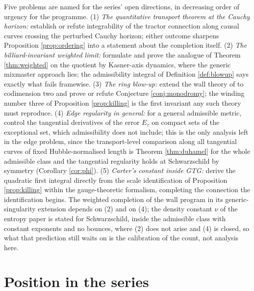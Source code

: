 \documentclass[11pt]{article}
\theoremstyle{definition}
\begin{document}
Five problems are named for the series' open directions, in decreasing order of urgency for the programme. (1) \emph{The quantitative transport theorem at the Cauchy horizon:} establish or refute integrability of the tractor connection along causal curves crossing the perturbed Cauchy horizon; either outcome sharpens Proposition \ref{prop:ordering} into a statement about the completion itself. (2) \emph{The billiard-invariant weighted limit:} formulate and prove the analogue of Theorem \ref{thm:weighted} on the quotient by Kasner-axis dynamics, where the generic mixmaster approach lies; the admissibility integral of Definition \ref{def:blowup} says exactly what fails framewise. (3) \emph{The ring blow-up:} extend the wall theory of \cite{ButlerT4} to codimension two and prove or refute Conjecture \ref{conj:monodromy}; the winding number three of Proposition \ref{prop:killing} is the first invariant any such theory must reproduce. (4) \emph{Edge regularity in general:} for a general admissible metric, control the tangential derivatives of the error $E_{\tau}$ on compact sets of the exceptional set, which admissibility does not include; this is the only analysis left in the edge problem, since the transport-level comparison along all tangential curves of fixed Hubble-normalised length is Theorem \ref{thm:duhamel} for the whole admissible class and the tangential regularity holds at Schwarzschild by symmetry (Corollary \ref{cor:phi}). (5) \emph{Carter's constant inside GTG:} derive the quadratic first integral directly from the scale identification of Proposition \ref{prop:killing} within the gauge-theoretic formalism, completing the connection the identification begins. The weighted completion of the wall program in its generic-singularity extension depends on (2) and on (4); the density constant $\nu$ of the entropy paper is stated for Schwarzschild, inside the admissible class with constant exponents and no bounces, where (2) does not arise and (4) is closed, so what that prediction still waits on is the calibration of the count, not analysis here.

\section{Position in the series}\label{sec:position}
\end{document}
